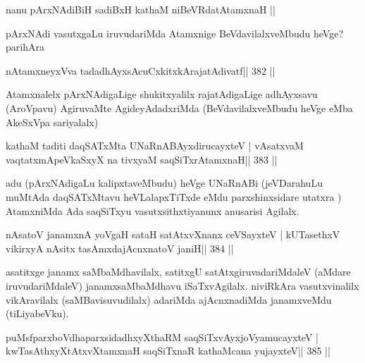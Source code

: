 
\begin{shl}
nanu pArxNAdiBiH sadiBxH kathaM niBeVRdatA\s\s tamxnaH ||
\end{shl}

\begin{artha}
pArxNAdi vasutxgaLu iruvudariMda Atamxnige BeVdavilalxveMbudu heVge? parihAra  \mdash 
\end{artha}

\begin{shl}
nA\s\s tamxneyxVva tadadhAyxsAcuCxkitxkArajatAdivatf\hfill || 382 ||
\end{shl}

\begin{artha}
Atamxnalelx pArxNAdigaLige shukitxyalilx rajatAdigaLige adhAyxsavu (AroVpavu) AgiruvaMte AgideyAdadxriMda (BeVdavilalxveMbudu heVge eMba AkeSxVpa sariyalalx)
\end{artha}

\begin{shl}
kathaM taditi daqSATxMta UNaRnABAyxdirucayxteV |
vAsatxvaM vaqtatxmApeVkaSxyX na tivxyaM saqSiTxrAtamxnaH\hfill || 383 ||
\end{shl}

\begin{artha}
adu (pArxNAdigaLu kalipxtaveMbudu) heVge UNaRnABi (jeVDarahuLu muMtAda  daqSATxMtavu heVLalapxTiTxde eMdu parxshinxsidare utatxra  \mdash ) AtamxniMda Ada saqSiTxyu vasutxsithxtiyanunx anusarisi Agilalx.
\end{artha}


\begin{shl}
nAsatoV janamxnA yoVgaH sataH satAtxvXnanx ceVSayxteV |
kUTasethxV vikirxyA nAsitx tasAmxdajAcnxnatoV janiH\hfill || 384 ||
\end{shl}

\begin{artha}
asatitxge janamx saMbaMdhavilalx, satitxgU satAtxgiruvadariMdaleV 
(aMdare iruvudariMdaleV) janamxsaMbaMdhavu iSaTxvAgilalx. niviRkAra vasutxvinalilx vikAravilalx (saMBavisuvudilalx) adariMda ajAcnxnadiMda janamxveMdu (tiLiyabeVku).
\end{artha}

\begin{shl}
puMsfparxboVdhaparxsidadhxyXthaRM saqSiTxvAyxjoV\s yamucayxteV |
kwTasAthxyXtAtxvXtamxnaH saqSiTxnaR kathaMcana yujayxteV\hfill || 385 ||
\end{shl}

